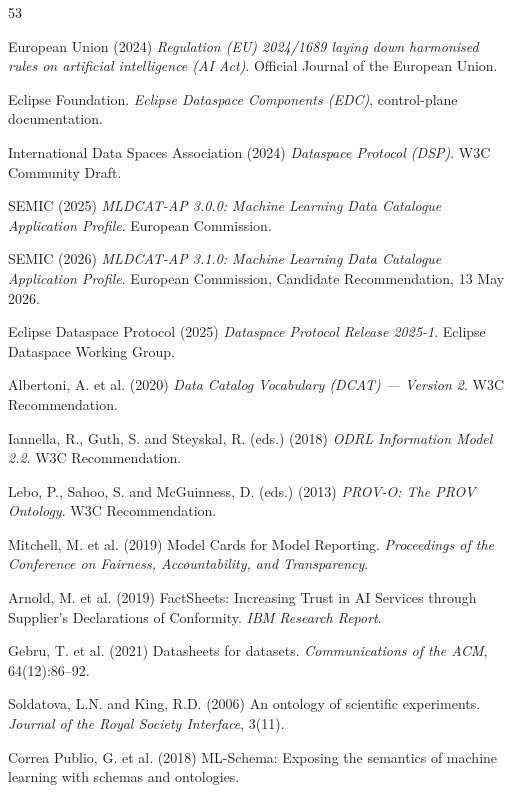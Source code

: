 \documentclass[Afour,sagev,times]{sagej}
\begin{document}
\begin{thebibliography}{53}

 European Union (2024) \emph{Regulation (EU) 2024/1689 laying down harmonised rules on artificial intelligence (AI Act)}. Official Journal of the European Union.

 Eclipse Foundation. \emph{Eclipse Dataspace Components (EDC)}, control-plane documentation.

 International Data Spaces Association (2024) \emph{Dataspace Protocol (DSP)}. W3C Community Draft.

 SEMIC (2025) \emph{MLDCAT-AP 3.0.0: Machine Learning Data Catalogue Application Profile}. European Commission.

 SEMIC (2026) \emph{MLDCAT-AP 3.1.0: Machine Learning Data Catalogue Application Profile}. European Commission, Candidate Recommendation, 13 May 2026.

 Eclipse Dataspace Protocol (2025) \emph{Dataspace Protocol Release 2025-1}. Eclipse Dataspace Working Group.

 Albertoni, A. et al. (2020) \emph{Data Catalog Vocabulary (DCAT) --- Version 2}. W3C Recommendation.

 Iannella, R., Guth, S. and Steyskal, R. (eds.) (2018) \emph{ODRL Information Model 2.2}. W3C Recommendation.

 Lebo, P., Sahoo, S. and McGuinness, D. (eds.) (2013) \emph{PROV-O: The PROV Ontology}. W3C Recommendation.

 Mitchell, M. et al. (2019) Model Cards for Model Reporting. \emph{Proceedings of the Conference on Fairness, Accountability, and Transparency}.

 Arnold, M. et al. (2019) FactSheets: Increasing Trust in AI Services through Supplier's Declarations of Conformity. \emph{IBM Research Report}.

 Gebru, T. et al. (2021) Datasheets for datasets. \emph{Communications of the ACM}, 64(12):86--92.

 Soldatova, L.N. and King, R.D. (2006) An ontology of scientific experiments. \emph{Journal of the Royal Society Interface}, 3(11).

 Correa Publio, G. et al. (2018) ML-Schema: Exposing the semantics of machine learning with schemas and ontologies.


\end{thebibliography}
\end{document}
